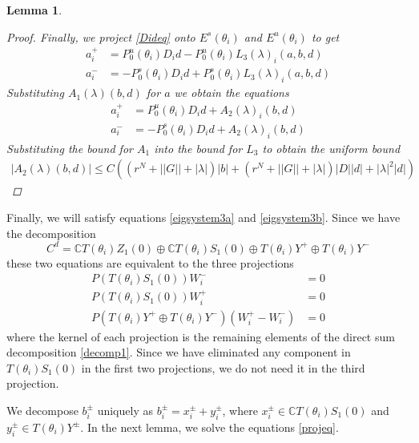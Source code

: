 \documentclass[12pt]{article}
\def\C{{\mathbb C}}
\newtheorem{lemma}{Lemma}
\begin{document}
\begin{lemma}
\begin{proof}
Finally, we project \eqref{Dideq} onto $E^s(\theta_i)$ and $E^u(\theta_i)$ to get
\begin{align*}
a_i^+ &= P_0^u(\theta_i) D_i d - P_0^u(\theta_i) L_3(\lambda)_i(a,b,d) \\
a_i^- &= -P_0^s(\theta_i) D_i d + P_0^s(\theta_i) L_3(\lambda)_i(a,b,d)
\end{align*}
Substituting $A_1(\lambda)(b,d)$ for $a$ we obtain the equations
\begin{align*}
a_i^+ &= P_0^u(\theta_i) D_i d + A_2(\lambda)_i(b,d) \\
a_i^- &= -P_0^s(\theta_i) D_i d + A_2(\lambda)_i(b,d)
\end{align*}
Substituting the bound for $A_1$ into the bound for $L_3$ to obtain the uniform bound
\begin{align*}
|A_2(\lambda)(b,d)| \leq 
C\left( (r^N + ||G|| + |\lambda| )|b| + (r^N + ||G|| + |\lambda|)|D||d| + |\lambda|^2 |d|  \right)
\end{align*}
\end{proof}
\end{lemma}

Finally, we will satisfy equations \eqref{eigsystem3a} and \eqref{eigsystem3b}. Since we have the decomposition
\begin{equation}\label{decomp1}
C^d = \C T(\theta_i) Z_1(0) \oplus \C T(\theta_i) S_1(0) \oplus T(\theta_i) Y^+ \oplus T(\theta_i) Y^-
\end{equation}
these two equations are equivalent to the three projections
\begin{equation}\label{projeq}
\begin{aligned}
P(T(\theta_i) S_1(0)) W_i^- &= 0 \\
P(T(\theta_i) S_1(0)) W_i^+ &= 0 \\
P(T(\theta_i) Y^+ \oplus T(\theta_i) Y^-) (W_i^+ - W_i^-) &= 0
\end{aligned}
\end{equation}
where the kernel of each projection is the remaining elements of the direct sum decomposition \eqref{decomp1}. Since we have eliminated any component in $T(\theta_i) S_1(0)$ in the first two projections, we do not need it in the third projection.

We decompose $b_i^\pm$ uniquely as $b_i^\pm = x_i^\pm + y_i^\pm$, where $x_i^\pm \in \C T(\theta_i) S_1(0)$ and $y_i^\pm \in T(\theta_i) Y^\pm$. In the next lemma, we solve the equations \eqref{projeq}.
\end{document}
